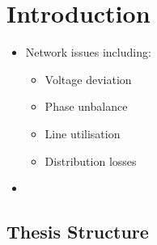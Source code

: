 \chapter{Introduction}
\label{ch-introduction}




\begin{itemize}
	\item Network issues including:
	\begin{itemize}
		\item Voltage deviation
		\item Phase unbalance
		\item Line utilisation
		\item Distribution losses
	\end{itemize}
	\item 
\end{itemize}











\section{Thesis Structure}

